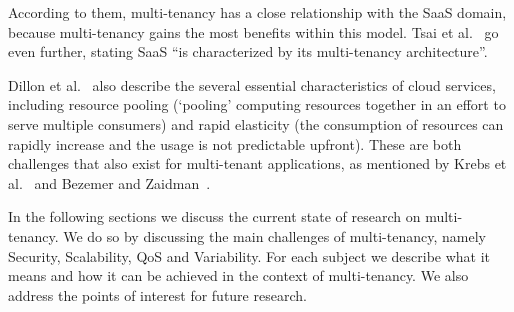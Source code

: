 According to them, multi-tenancy has a close relationship with the \ac{SaaS} domain, because multi-tenancy gains the most benefits within this model. Tsai et al.~\cite{tsai2010towards} go even further, stating \ac{SaaS} ``is characterized by its multi-tenancy architecture''. 

Dillon et al.~\cite{dillon2010cloud} also describe the several essential characteristics of cloud services, including resource pooling (`pooling' computing resources together in an effort to serve multiple consumers) and rapid elasticity (the consumption of resources can rapidly increase and the usage is not predictable upfront). These are both challenges that also exist for multi-tenant applications, as mentioned by Krebs et al.~\cite{krebs2012architecture} and Bezemer and Zaidman~\cite{bezemer2010multi}.

In the following sections we discuss the current state of research on multi-tenancy. We do so by discussing the main challenges of multi-tenancy, namely Security, Scalability, \ac{QoS} and Variability. For each subject we describe what it means and how it can be achieved in the context of multi-tenancy. We also address the points of interest for future research.
